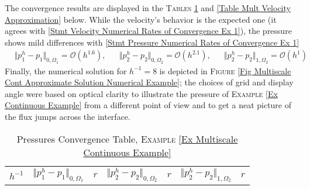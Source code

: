 \documentclass[3p]{elsarticle}
\def\uone{\mathbf{u}_{1}}
\def\uoneh{\mathbf{u}_{1}^{h}}
\def\utwo{\mathbf{u}_{2}}
\def\utwoh{\mathbf{u}_{2}^{h}}
\def\Hdiv{\mathbf{H_{div}}}
\def\pone{p_{1}}
\def\poneh{p_{1}^{h}}
\def\ptwo{p_{2}}
\def\ptwoh{p_{2}^{h}}
\begin{document}
\begin{example}
The convergence results are displayed in the \textsc{Tables} \ref{Table Mult Pressure Approximation} and \ref{Table Mult Velocity Approximation} below. While the velocity's behavior is the expected one (it agrees with \eqref{Stmt Velocity Numerical Rates of Convergence Ex 1}), the pressure shows mild differences with \eqref{Stmt Pressure Numerical Rates of Convergence Ex 1}
%
%
%
\begin{align}\label{Stmt Pressure Numerical Rates of Convergence Ex 3}
& \Vert \poneh - \pone \Vert_{0, \Omega_{1}} = \mathcal{O}(h^{1.6}) ,&
& \Vert \ptwoh - \ptwo \Vert_{0, \Omega_{2}} = \mathcal{O}(h^{2.1}) , &
& \Vert \ptwoh - \ptwo \Vert_{1, \Omega_{2}} = \mathcal{O}(h^{1}) 
\end{align}
%
%
Finally, the numerical solution for $ h^{-1} =8 $ is depicted in \textsc{Figure}  \ref{Fig Multiscale Cont Approximate Solution Numerical Example}; the choices of grid and display angle were based on optical clarity to illustrate the pressure of \textsc{Example} \ref{Ex Continuous Example} from a different point of view and to get a neat picture of the flux jumps across the interface. 
%
\begin{table}[h!]
\caption{Pressures Convergence Table, \textsc{Example} \ref{Ex Multiscale Continuous Example}}\label{Table Mult Pressure Approximation}
\def\arraystretch{1.4}
\begin{center}
\begin{tabular}{ c c c c c c c }
    \hline
    \rowcolor{gray!50}
$ h^{-1} $  
& $\Vert  \poneh- p_{1}  \Vert_{ 0, \Omega_{1} } $ 
& $r$  
& $\Vert  \ptwoh- p_{2}  \Vert_{0, \Omega_{2} }$ 
& $r$
& $\Vert  \ptwoh- p_{2}  \Vert_{1, \Omega_{2} }$ 
& $r$ \\ %

\end{tabular}
\end{center}
\end{table}
\end{example}
\end{document}
